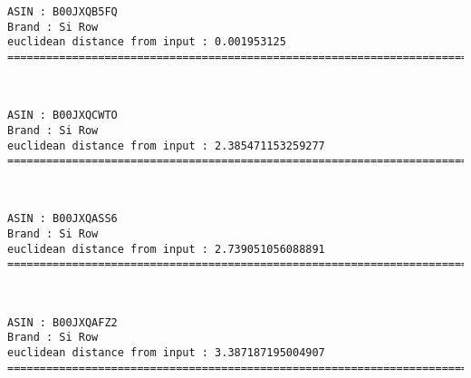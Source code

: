 \documentclass[11pt]{article}
\begin{document}
    \begin{Verbatim}[commandchars=\\\{\}]
ASIN : B00JXQB5FQ
Brand : Si Row
euclidean distance from input : 0.001953125
=============================================================================================================================

    \end{Verbatim}

    
    
    \begin{center}
    \end{center}
    { \hspace*{\fill} \\}
    
    \begin{Verbatim}[commandchars=\\\{\}]
ASIN : B00JXQCWTO
Brand : Si Row
euclidean distance from input : 2.385471153259277
=============================================================================================================================

    \end{Verbatim}

    
    
    \begin{center}
    \end{center}
    { \hspace*{\fill} \\}
    
    \begin{Verbatim}[commandchars=\\\{\}]
ASIN : B00JXQASS6
Brand : Si Row
euclidean distance from input : 2.739051056088891
=============================================================================================================================

    \end{Verbatim}

    
    
    \begin{center}
    \end{center}
    { \hspace*{\fill} \\}
    
    \begin{Verbatim}[commandchars=\\\{\}]
ASIN : B00JXQAFZ2
Brand : Si Row
euclidean distance from input : 3.387187195004907
=============================================================================================================================

    \end{Verbatim}
\end{document}
